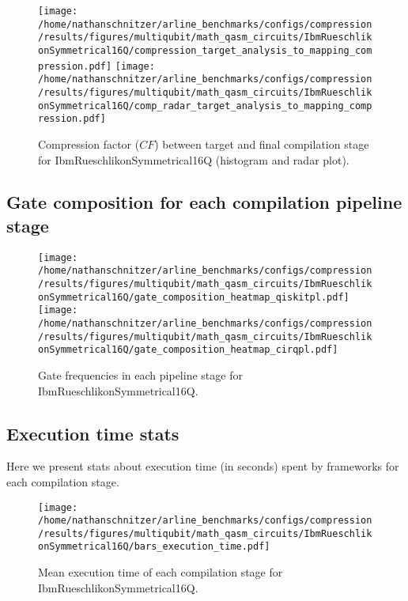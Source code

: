 \documentclass{report}%
\begin{document}
%


\begin{figure}[h!]%
\centering%
\texttt{[image: /home/nathanschnitzer/arline\_benchmarks/configs/compression/results/figures/multiqubit/math\_qasm\_circuits/IbmRueschlikonSymmetrical16Q/compression\_target\_analysis\_to\_mapping\_compression.pdf]}%
\centering%
\texttt{[image: /home/nathanschnitzer/arline\_benchmarks/configs/compression/results/figures/multiqubit/math\_qasm\_circuits/IbmRueschlikonSymmetrical16Q/comp\_radar\_target\_analysis\_to\_mapping\_compression.pdf]}%
\caption{Compression factor ($CF$) between target and final compilation stage for IbmRueschlikonSymmetrical16Q
                        (histogram and radar plot).
                        }%
\end{figure}

%
\clearpage%
\subsection*{Gate composition for each compilation pipeline stage}%
\label{subsec:Gatecompositionforeachcompilationpipelinestage}%

%


\begin{figure}[h!]%
\centering%
\texttt{[image: /home/nathanschnitzer/arline\_benchmarks/configs/compression/results/figures/multiqubit/math\_qasm\_circuits/IbmRueschlikonSymmetrical16Q/gate\_composition\_heatmap\_qiskitpl.pdf]}%
\centering%
\texttt{[image: /home/nathanschnitzer/arline\_benchmarks/configs/compression/results/figures/multiqubit/math\_qasm\_circuits/IbmRueschlikonSymmetrical16Q/gate\_composition\_heatmap\_cirqpl.pdf]}%
\linebreak%
\caption{Gate frequencies in each pipeline stage for IbmRueschlikonSymmetrical16Q.}%
\end{figure}

%
\subsection*{Execution time stats }%
\label{subsec:Executiontimestats}%

%
Here we present stats about execution time (in seconds)
                spent by frameworks for each compilation stage.%


\begin{figure}[h!]%
\centering%
\texttt{[image: /home/nathanschnitzer/arline\_benchmarks/configs/compression/results/figures/multiqubit/math\_qasm\_circuits/IbmRueschlikonSymmetrical16Q/bars\_execution\_time.pdf]}%
\caption{Mean execution time of each compilation stage for IbmRueschlikonSymmetrical16Q.}%
\end{figure}
\end{document}
